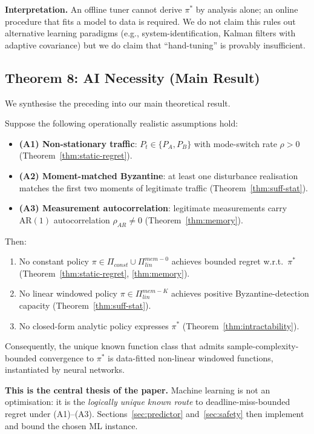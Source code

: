 \textbf{Interpretation.} An offline tuner cannot derive $\pi^*$ by
analysis alone; an online procedure that fits a model to data is
required. We do not claim this rules out alternative learning
paradigms (e.g., system-identification, Kalman filters with adaptive
covariance) but we do claim that ``hand-tuning'' is provably
insufficient.

\subsection{Theorem 8: AI Necessity (Main Result)}

We synthesise the preceding into our main theoretical result.

\begin{theorem}
\label{thm:ai-necessity}
Suppose the following operationally realistic assumptions hold:
\begin{itemize}\setlength\itemsep{1pt}
\item \textbf{(A1) Non-stationary traffic}: $P_t \in \{P_A, P_B\}$ with
mode-switch rate $\rho > 0$ (Theorem~\ref{thm:static-regret}).
\item \textbf{(A2) Moment-matched Byzantine}: at least one disturbance
realisation matches the first two moments of legitimate traffic
(Theorem~\ref{thm:suff-stat}).
\item \textbf{(A3) Measurement autocorrelation}: legitimate
measurements carry $\mathrm{AR}(1)$ autocorrelation $\rho_{AR} \neq 0$
(Theorem~\ref{thm:memory}).
\end{itemize}
Then:
\begin{enumerate}
\item No constant policy $\pi \in \Pi_{const} \cup \Pi_{lin}^{mem-0}$
achieves bounded regret w.r.t.\ $\pi^*$
(Theorem~\ref{thm:static-regret}, \ref{thm:memory}).
\item No linear windowed policy $\pi \in \Pi_{lin}^{mem-K}$ achieves
positive Byzantine-detection capacity
(Theorem~\ref{thm:suff-stat}).
\item No closed-form analytic policy expresses $\pi^*$
(Theorem~\ref{thm:intractability}).
\end{enumerate}
Consequently, the unique known function class that admits
sample-complexity-bounded convergence to $\pi^*$ is data-fitted
non-linear windowed functions, instantiated by neural networks.
\end{theorem}

\textbf{This is the central thesis of the paper.} Machine learning is
not an optimisation: it is the \emph{logically unique known route} to
deadline-miss-bounded regret under (A1)--(A3). Sections~\ref{sec:predictor}
and~\ref{sec:safety} then implement and bound the chosen ML instance.

